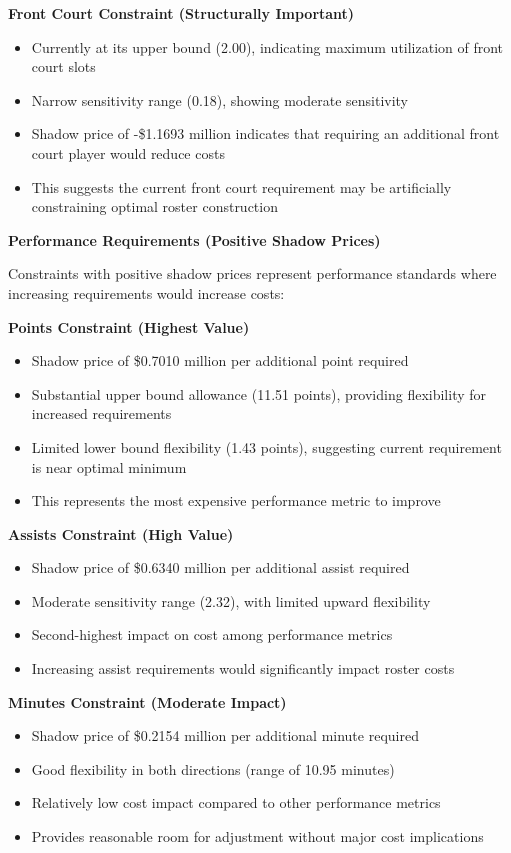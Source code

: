 \documentclass[a4paper,11pt]{article}
\newcommand{\vsp}{\vspace{0.5em}}
\begin{document}
\textbf{Front Court Constraint (Structurally Important)}
\begin{itemize}
    \item Currently at its upper bound (2.00), indicating maximum utilization of front court slots
    \item Narrow sensitivity range (0.18), showing moderate sensitivity
    \item Shadow price of -\$1.1693 million indicates that requiring an additional front court player would reduce costs
    \item This suggests the current front court requirement may be artificially constraining optimal roster construction
\end{itemize}

\textbf{Performance Requirements (Positive Shadow Prices)}

Constraints with positive shadow prices represent performance standards where increasing requirements would increase costs:

\vsp

\textbf{Points Constraint (Highest Value)}
\begin{itemize}
    \item Shadow price of \$0.7010 million per additional point required
    \item Substantial upper bound allowance (11.51 points), providing flexibility for increased requirements
    \item Limited lower bound flexibility (1.43 points), suggesting current requirement is near optimal minimum
    \item This represents the most expensive performance metric to improve
\end{itemize}

\textbf{Assists Constraint (High Value)}
\begin{itemize}
    \item Shadow price of \$0.6340 million per additional assist required
    \item Moderate sensitivity range (2.32), with limited upward flexibility
    \item Second-highest impact on cost among performance metrics
    \item Increasing assist requirements would significantly impact roster costs
\end{itemize}

\textbf{Minutes Constraint (Moderate Impact)}
\begin{itemize}
    \item Shadow price of \$0.2154 million per additional minute required
    \item Good flexibility in both directions (range of 10.95 minutes)
    \item Relatively low cost impact compared to other performance metrics
    \item Provides reasonable room for adjustment without major cost implications
\end{itemize}
\end{document}
